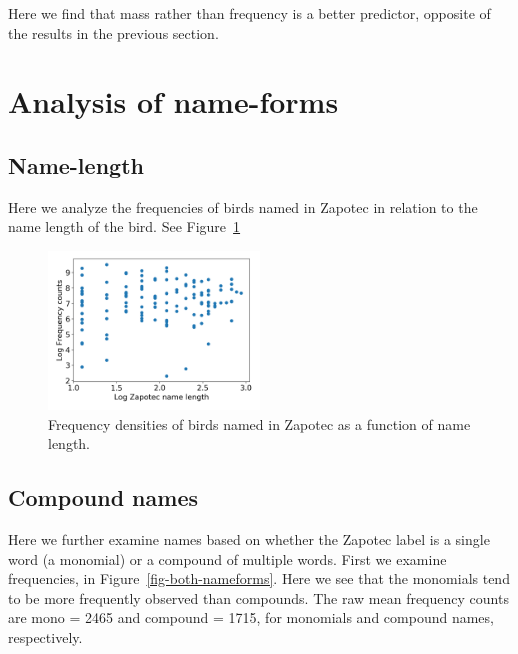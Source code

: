 \documentclass[10pt,letterpaper]{article}
\begin{document}
Here we find that mass rather than frequency is a better predictor, opposite of the results in the previous section.





\section{Analysis of name-forms}

\subsection{Name-length}
Here we analyze the frequencies of birds named in Zapotec in relation to the name length of the bird. See Figure~\ref{fig-freq-namelength}

\begin{figure}[ht!]
  \begin{center}
    \includegraphics[width=0.5\textwidth]{./figures/freq-namelength.png}
        \caption{Frequency densities of birds named in Zapotec as a function of name length.}
        \label{fig-freq-namelength}
  \end{center}
\end{figure}

\subsection{Compound names}
Here we further examine names based on whether the Zapotec label is a single word (a monomial) or a compound of multiple words. First we examine frequencies, in Figure~\ref{fig-both-nameforms}. Here we see that the monomials tend to be more frequently observed than compounds. The raw mean frequency counts are mono = 2465 and compound = 1715, for monomials and compound names, respectively.

\end{document}
